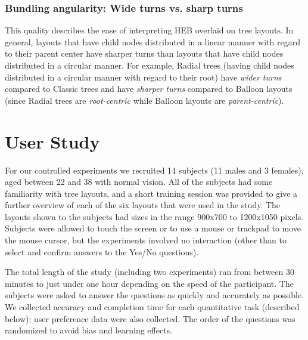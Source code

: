\documentclass[a4paper]{llncs}
\begin{document}
\subsubsection*{Bundling angularity: Wide turns vs. sharp turns} This quality describes the ease of interpreting HEB overlaid on tree layouts. In general, layouts that have child nodes distributed in a linear manner with regard to their parent center have sharper turns than layouts that have child nodes distributed in a circular manner. For example, Radial trees (having child nodes distributed in a circular manner with regard to their root) have \textit{wider turns} compared to Classic trees and have \textit{sharper turns} compared to Balloon layouts (since Radial trees are \textit{root-centric} while Balloon layouts are \textit{parent-centric}). %




\section{User Study}
\label{User Study}
For our controlled experiments we recruited 14 subjects (11 males and 3 females), aged between 22 and 38 with normal vision. All of the subjects had some familiarity with tree layouts, and a short training session was provided to give a further overview of each of the six layouts that were used in the study. The layouts shown to the subjects had sizes in the range 900x700 to 1200x1050 pixels. Subjects were allowed to touch the screen or to use a mouse or trackpad to move the mouse cursor, but the experiments involved no interaction (other than to select and confirm answers to the Yes/No questions).

The total length of the study (including two experiments) ran from between 30 minutes to just under one hour depending on the speed of the participant. The subjects were asked to answer the questions as quickly and accurately as possible. We collected accuracy and completion time for each quantitative task (described below); user preference data were also collected. The order of the questions was randomized to avoid bias and learning effects. 
\end{document}
